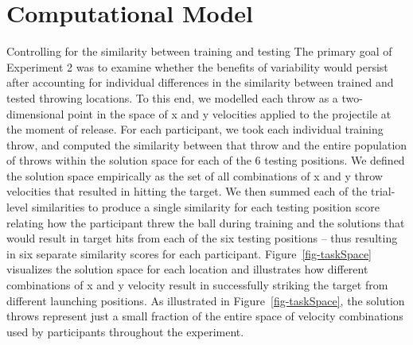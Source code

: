 \documentclass[
  12pt,
  letterpaper,
]{article}
\begin{document}
\section{Computational Model}\label{computational-model}

Controlling for the similarity between training and testing The primary
goal of Experiment 2 was to examine whether the benefits of variability
would persist after accounting for individual differences in the
similarity between trained and tested throwing locations. To this end,
we modelled each throw as a two-dimensional point in the space of x and
y velocities applied to the projectile at the moment of release. For
each participant, we took each individual training throw, and computed
the similarity between that throw and the entire population of throws
within the solution space for each of the 6 testing positions. We
defined the solution space empirically as the set of all combinations of
x and y throw velocities that resulted in hitting the target. We then
summed each of the trial-level similarities to produce a single
similarity for each testing position score relating how the participant
threw the ball during training and the solutions that would result in
target hits from each of the six testing positions -- thus resulting in
six separate similarity scores for each participant.
Figure~\ref{fig-taskSpace} visualizes the solution space for each
location and illustrates how different combinations of x and y velocity
result in successfully striking the target from different launching
positions. As illustrated in Figure~\ref{fig-taskSpace}, the solution
throws represent just a small fraction of the entire space of velocity
combinations used by participants throughout the experiment.
\end{document}
